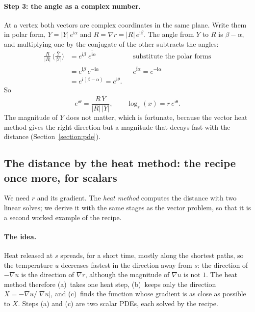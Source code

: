 \paragraph{Step 3: the angle as a complex number.} At a vertex both vectors are complex coordinates in the same plane. Write them in polar form, $Y = |Y|\, e^{\mathrm i\alpha}$ and $R = \nabla r = |R|\, e^{\mathrm i\beta}$. The angle from $Y$ to $R$ is $\beta - \alpha$, and multiplying one by the conjugate of the other subtracts the angles:
\begin{align*}
\frac{R}{|R|}\,\overline{\Big(\frac{Y}{|Y|}\Big)} &= e^{\mathrm i\beta}\; \overline{e^{\mathrm i\alpha}} && \text{substitute the polar forms} \\
&= e^{\mathrm i\beta}\, e^{-\mathrm i\alpha} && \overline{e^{\mathrm i\alpha}} = e^{-\mathrm i\alpha} \\
&= e^{\mathrm i(\beta - \alpha)} = e^{\mathrm i\theta} .
\end{align*}
So
\begin{equation}
\label{eqn:app_theta}
e^{\mathrm i\theta} = \frac{R\,\overline{Y}}{|R|\,|Y|}, \qquad \log_s(x) = r\, e^{\mathrm i\theta} .
\end{equation}
The magnitude of $Y$ does not matter, which is fortunate, because the vector heat method gives the right direction but a magnitude that decays fast with the distance (Section~\ref{section:pde}).

\subsection{The distance by the heat method: the recipe once more, for scalars}

We need $r$ and its gradient. The \emph{heat method} computes the distance with two linear solves; we derive it with the same stages as the vector problem, so that it is a second worked example of the recipe.

\paragraph{The idea.} Heat released at $s$ spreads, for a short time, mostly along the shortest paths, so the temperature $u$ decreases fastest in the direction away from $s$: the direction of $-\nabla u$ is the direction of $\nabla r$, although the magnitude of $\nabla u$ is not $1$. The heat method therefore (a)~takes one heat step, (b)~keeps only the direction $X = -\nabla u/|\nabla u|$, and (c)~finds the function whose gradient is as close as possible to $X$. Steps (a) and (c) are two scalar PDEs, each solved by the recipe.


